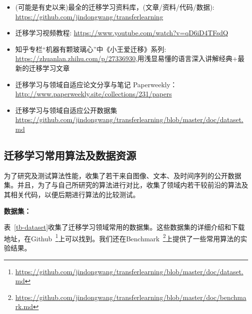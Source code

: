 \begin{itemize}
	\item (可能是有史以来)最全的迁移学习资料库，(文章/资料/代码/数据):	\url{https://github.com/jindongwang/transferlearning}
	\item 迁移学习视频教程:	\url{https://www.youtube.com/watch?v=qD6iD4TFsdQ}
	\item 知乎专栏“机器有颗玻璃心”中《小王爱迁移》系列:	\url{https://zhuanlan.zhihu.com/p/27336930},用浅显易懂的语言深入讲解经典+最新的迁移学习文章
	\item 迁移学习与领域自适应论文分享与笔记	Paperweekly：\url{http://www.paperweekly.site/collections/231/papers}
	\item 迁移学习与领域自适应公开数据集
	\url{https://github.com/jindongwang/transferlearning/blob/master/doc/dataset.md}
\end{itemize}

\subsection{迁移学习常用算法及数据资源}
\label{sec-dataset}

为了研究及测试算法性能，收集了若干来自图像、文本、及时间序列的公开数据集。并且，为了与自己所研究的算法进行对比，收集了领域内若干较前沿的算法及其相关代码，以便后期进行算法的比较测试。

\textbf{数据集：}

表~\ref{tb-dataset}收集了迁移学习领域常用的数据集。这些数据集的详细介绍和下载地址，在Github~\footnote{\url{https://github.com/jindongwang/transferlearning/blob/master/doc/dataset.md}}上可以找到。我们还在Benchmark~\footnote{\url{https://github.com/jindongwang/transferlearning/blob/master/doc/benchmark.md}}上提供了一些常用算法的实验结果。

